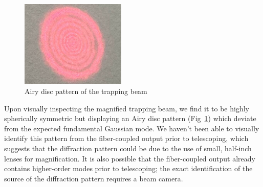 \documentclass[aps,prb,twocolumn,superscriptaddress,floatfix,longbibliography,citeautoscript]{revtex4-2}
\begin{document}
\begin{figure}
    \centering
    \includegraphics[width=5cm]{./figs/airy_pattern.jpg}
    \caption{Airy disc pattern of the trapping beam}
    \label{fig:airy}
\end{figure}
Upon visually inspecting the magnified trapping beam, we find it to be highly spherically symmetric but displaying an Airy disc pattern 
(Fig~\ref{fig:airy}) which deviate from the expected fundamental Gaussian mode. 
We haven't been able to visually identify this pattern from the fiber-coupled 
output prior to telescoping, which suggests that the diffraction pattern could be due to the use of small, half-inch lenses for magnification. 
It is also possible that the fiber-coupled output already contains higher-order modes prior to telescoping; the exact identification of the source of the diffraction pattern requires a beam camera. 
\end{document}
